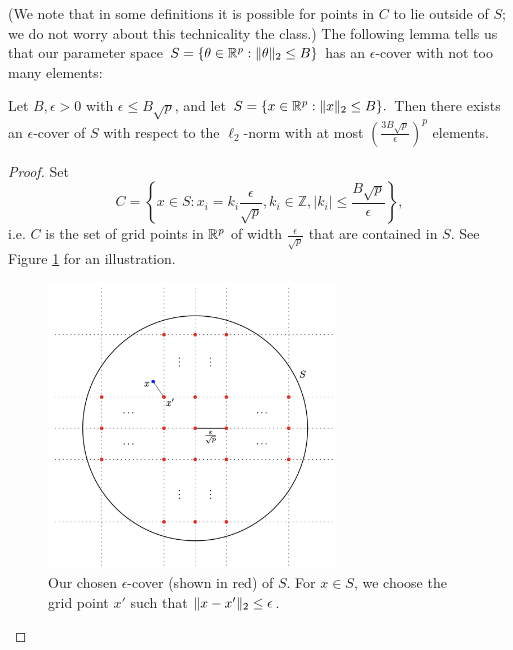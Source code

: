 (We note that in some definitions it is possible for points in $C$ to lie outside of $S$; we do not worry about this technicality the class.) The following lemma tells us that our parameter space $S = \{\theta \in \mathbb R^p: \|\theta\|_2 \le B\}$ has an $\epsilon$-cover with not too many elements:

\begin{lemma}\label{lec4:lem:ECSize}
Let $B,\epsilon>0$ with $\epsilon \le B \sqrt{p}$, and let $S = \{x \in \mathbb R^p: \|x\|_2 \le B\}.$ Then there exists an $\epsilon$-cover of $S$ with respect to the $\ell_2$-norm with at most $\left(\frac{3B\sqrt{p}}{\epsilon}\right)^p$ elements.
\end{lemma}

\begin{proof}
Set
\begin{equation}
C = \left\{ x \in S: x_i = k_i \frac{\epsilon}{\sqrt{p}}, k_i \in \mathbb{Z}, |k_i| \leq  \frac{B\sqrt{p}}{\epsilon}  \right\},
\end{equation}
i.e. $C$ is the set of grid points in $\mathbb R^p$ of width $\tfrac{\epsilon}{\sqrt{p}}$ that are contained in $S$. See Figure \ref{lec5:fig:ecover} for an illustration. 
\begin{figure}[ht]
\centerline{\includegraphics[width=3in]{figures/ECover.png}}
\caption[lec5:fig:ecover]{Our chosen $\epsilon$-cover (shown in red) of $S$. For $x \in S$, we choose the grid point $x'$ such that $\|x-x'\|_2 \le \epsilon$. }
\label{lec5:fig:ecover}
\end{figure}


\end{proof}
